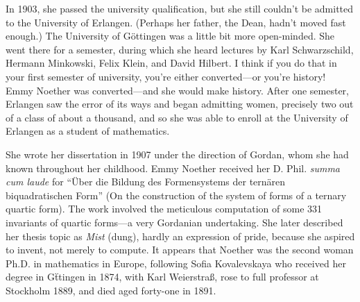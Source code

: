 \documentclass[twoside,symmetric]{tufte-handout}
\begin{document}
%
%

In 1903, she passed the university qualification, but she still couldn't be admitted to the University of Erlangen. (Perhaps her father, the Dean, hadn't moved fast enough.) The University of G\"ottingen was a little bit more open-minded. She went there for a semester, during which she heard lectures by Karl Schwarzschild, Hermann Minkowski, Felix Klein, and David Hilbert. I think if you do that in your first semester of university, you're either converted---or you're history! Emmy Noether was converted---and she would make history. After one semester, Erlangen saw the error of its ways and began admitting women, precisely two out of a class of about a thousand, and so she was able to enroll at the University of Erlangen as a student of mathematics.

She wrote her dissertation in 1907 under the direction of Gordan, whom she had known throughout her childhood. Emmy Noether received her D. Phil. \emph{summa cum laude} for ``Über die Bildung des Formensystems der ternären biquadratischen Form'' (On the construction of the system of forms of a ternary quartic form). The work involved the meticulous computation of some 331 invariants of quartic forms---a very Gordanian undertaking. She later described her thesis topic as \emph{Mist} (dung), hardly an expression of pride, because she aspired to invent, not merely to compute. It appears that Noether was the second woman Ph.D. in mathematics in Europe, following Sofia Kovalevskaya who received her degree in G\"ttingen in 1874, with Karl Weierstra\ss, rose to full professor at Stockholm 1889, and died aged forty-one in 1891.
\end{document}
